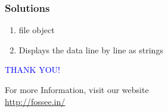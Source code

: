 \documentclass[presentation]{beamer}
\begin{document}
\begin{frame}
\frametitle{Solutions}
\label{sec-8}


\begin{enumerate}
\item file object
\vspace{10pt}
\item Displays the data line by line as strings
\end{enumerate}
\end{frame}
\begin{frame}

  \begin{block}{}
  \begin{center}
  \textcolor{blue}{\Large THANK YOU!} 
  \end{center}
  \end{block}
\begin{block}{}
  \begin{center}
    For more Information, visit our website\\
    \url{http://fossee.in/}
  \end{center}  
  \end{block}
\end{frame}
\end{document}
